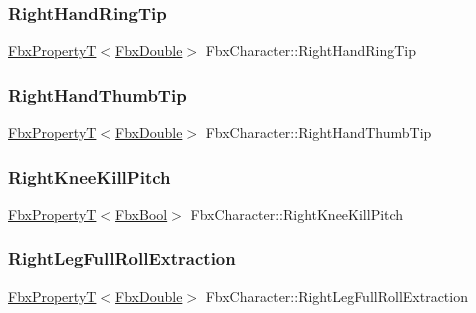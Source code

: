 \subsubsection{\texorpdfstring{Right\+Hand\+Ring\+Tip}{RightHandRingTip}}
{\footnotesize\ttfamily \hyperlink{class_fbx_property_t}{Fbx\+PropertyT}$<$\hyperlink{fbxtypes_8h_a171e72a1c46fc15c1a6c9c31948c1c5b}{Fbx\+Double}$>$ Fbx\+Character\+::\+Right\+Hand\+Ring\+Tip}

\mbox{\label{class_fbx_character_a9f4c954aa28a467e6ff84c2a596b308c}} 
\subsubsection{\texorpdfstring{Right\+Hand\+Thumb\+Tip}{RightHandThumbTip}}
{\footnotesize\ttfamily \hyperlink{class_fbx_property_t}{Fbx\+PropertyT}$<$\hyperlink{fbxtypes_8h_a171e72a1c46fc15c1a6c9c31948c1c5b}{Fbx\+Double}$>$ Fbx\+Character\+::\+Right\+Hand\+Thumb\+Tip}

\mbox{\label{class_fbx_character_ac52d41bf76dd4a9cddf41e7bf465590d}} 
\subsubsection{\texorpdfstring{Right\+Knee\+Kill\+Pitch}{RightKneeKillPitch}}
{\footnotesize\ttfamily \hyperlink{class_fbx_property_t}{Fbx\+PropertyT}$<$\hyperlink{fbxtypes_8h_a92e0562b2fe33e76a242f498b362262e}{Fbx\+Bool}$>$ Fbx\+Character\+::\+Right\+Knee\+Kill\+Pitch}

\mbox{\label{class_fbx_character_aefa979f235675c3dff6d25d2d32716e5}} 
\subsubsection{\texorpdfstring{Right\+Leg\+Full\+Roll\+Extraction}{RightLegFullRollExtraction}}
{\footnotesize\ttfamily \hyperlink{class_fbx_property_t}{Fbx\+PropertyT}$<$\hyperlink{fbxtypes_8h_a171e72a1c46fc15c1a6c9c31948c1c5b}{Fbx\+Double}$>$ Fbx\+Character\+::\+Right\+Leg\+Full\+Roll\+Extraction}

